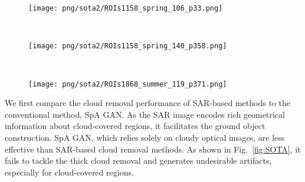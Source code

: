 \documentclass[a4paper,fleqn]{cas-dc}
\begin{document}
 \def\sswidth{0.95\textwidth}
\begin{figure*}[!t]
    \centering
    \begin{subfigure}[b]{\sswidth}
     \centering
     \texttt{[image: png/sota2/ROIs1158\_spring\_106\_p33.png]}
    \end{subfigure}
    \vspace{1.5mm}
    \\
    \begin{subfigure}[b]{\sswidth}
     \centering
     \texttt{[image: png/sota2/ROIs1158\_spring\_140\_p358.png]}
    \end{subfigure}
    \vspace{1.5mm}
    \\
    \begin{subfigure}[b]{\sswidth}
     \centering
     \texttt{[image: png/sota2/ROIs1868\_summer\_119\_p371.png]}
    \end{subfigure}
    \vspace{0mm}
    \caption{Qualitative results of cloud removal for 3 different scenes. For each scene, from top-left to bottom-right are respectively the cloudy image, the SAR image, the result from SpA GAN,  SAR2OPT, SAR-Opt-cGAN, Simulation-Fusion GAN (SF GAN), DSen2-CR, {\it Concat}, GLF-CR, and the cloud-free image. The size of each image is $128 \times 128$ pixels.}	
    \label{fig:SOTA}
    \vspace{-3mm}
\end{figure*}




















%
 
We first compare the cloud removal performance of SAR-based methods to the conventional method, SpA GAN. As the SAR image encodes rich geometrical information about cloud-covered regions, it facilitates the ground object construction. SpA GAN, which relies solely on cloudy optical images, are less effective than SAR-based cloud removal methods.
As shown in Fig.~\ref{fig:SOTA},
it fails to tackle the thick cloud removal and generates undesirable artifacts, especially for cloud-covered regions.
\end{document}
